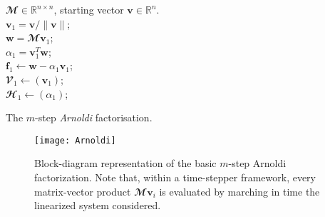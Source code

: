     \begin{algorithm}
      \begin{algorithmic}
        \REQUIRE $\mathbfcal{M} \in \mathbb{R}^{n \times n}$, starting vector $\mathbf{v} \in \mathbb{R}^n$.\\
        $\mathbf{v}_1 = \mathbf{v} / \| \mathbf{v} \|$;\\
        $\mathbf{w} = \mathbfcal{M} \mathbf{v}_1$; \\
        $\alpha_1 = \mathbf{v}_1^T \mathbf{w}$;\\
        $\mathbf{f}_1 \leftarrow \mathbf{w} - \alpha_1 \mathbf{v}_1$;\\
        $\mathbfcal{V}_1 \leftarrow \left( \mathbf{v}_1 \right)$; \\
        $\mathbfcal{H}_1 \leftarrow (\alpha_1)$;\\
        \ENDFOR
      \end{algorithmic}
      \caption{The $m$-step \emph{Arnoldi} factorisation.}
      \label{algo: Arnoldi}
    \end{algorithm}

    \begin{figure}[b]
      \centering
      \texttt{[image: Arnoldi]}
      \caption{Block-diagram representation of the basic $m$-step Arnoldi factorization. Note that, within a time-stepper framework, every matrix-vector product $\mathbfcal{M} \mathbf{v}_i$ is evaluated by marching in time the linearized system considered.}
      \label{fig: numerics -- arnoldi decomposition}
    \end{figure}


